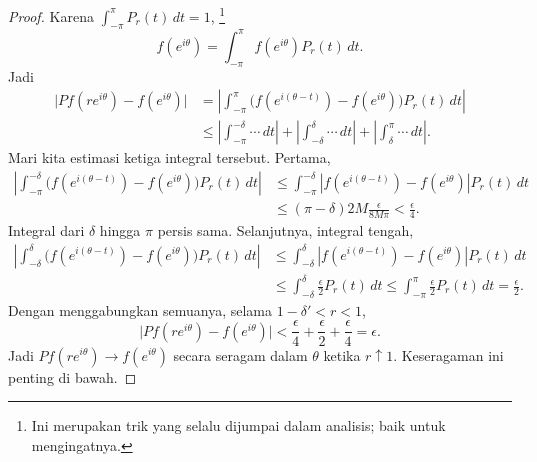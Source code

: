 \documentclass[12pt,openany]{book}
\newcommand{\sabs}[1]{\lvert {#1} \rvert}
\newcommand{\abs}[1]{\left\lvert {#1} \right\rvert}
\theoremstyle{plain}
\theoremstyle{remark}
\theoremstyle{definition}
\theoremstyle{exercise}
\theoremstyle{example}
\begin{document}
\begin{proof}
Karena
$\int_{-\pi}^\pi P_r(t) \, dt = 1$,%
\footnote{Ini merupakan trik yang selalu dijumpai dalam analisis; baik untuk
mengingatnya.}
\begin{equation*}
f(e^{i\theta})=
\int_{-\pi}^\pi f(e^{i\theta}) P_r(t) \, dt .
\end{equation*}
Jadi
\begin{equation*}
\begin{split}
\sabs{
Pf(r e^{i\theta} ) - f(e^{i\theta})
}
& =
\abs{
\int_{-\pi}^{\pi} \bigl( f(e^{i(\theta-t)})-f(e^{i\theta}) \bigr) P_r(t) \, dt
}
\\
& \leq
\abs{
\int_{-\pi}^{-\delta} \cdots \, dt
}
+
\abs{
\int_{-\delta}^{\delta} \cdots \, dt
}
+
\abs{
\int_{\delta}^\pi \cdots \, dt
} .
\end{split}
\end{equation*}
Mari kita estimasi ketiga integral tersebut.
Pertama,
\begin{equation*}
\begin{split}
\abs{
\int_{-\pi}^{-\delta} \bigl( f(e^{i(\theta-t)})-f(e^{i\theta}) \bigr) P_r(t) \, dt
}
& \leq
\int_{-\pi}^{-\delta} \abs{ f(e^{i(\theta-t)})-f(e^{i\theta}) }
P_r(t) \, dt
\\
& \leq (\pi-\delta) 2M \frac{\epsilon}{8M\pi} < \frac{\epsilon}{4} .
\end{split}
\end{equation*}
Integral dari $\delta$ hingga $\pi$ persis sama.
Selanjutnya, integral tengah,
\begin{equation*}
\begin{split}
\abs{
\int_{-\delta}^{\delta} \bigl( f(e^{i(\theta-t)})-f(e^{i\theta}) \bigr) P_r(t) \, dt
}
& \leq
\int_{-\delta}^{\delta} \abs{f(e^{i(\theta-t)})-f(e^{i\theta})}
P_r(t) \, dt
\\
& \leq
\int_{-\delta}^{\delta} \frac{\epsilon}{2} P_r(t) \, dt
\leq
\int_{-\pi}^{\pi} \frac{\epsilon}{2} P_r(t) \, dt
=\frac{\epsilon}{2} .
\end{split}
\end{equation*}
Dengan menggabungkan semuanya, selama $1-\delta' < r < 1$,
\begin{equation*}
\sabs{
Pf(r e^{i\theta} ) - f(e^{i\theta})
} < \frac{\epsilon}{4} + \frac{\epsilon}{2} + \frac{\epsilon}{4} =
\epsilon.
\end{equation*}
Jadi $Pf(re^{i\theta}) \to f(e^{i\theta})$ secara seragam dalam $\theta$
ketika $r \uparrow 1$.
Keseragaman ini penting di bawah.


\end{proof}
\end{document}
